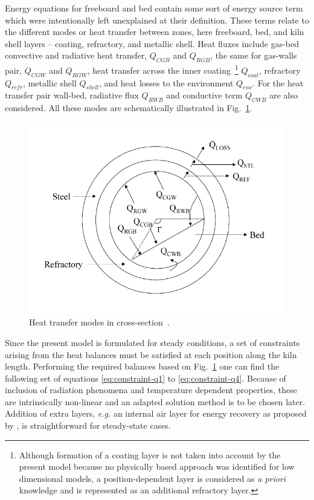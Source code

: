 \documentclass[11pt]{paper}
\begin{document}
Energy equations for freeboard and bed contain some sort of energy source term which were intentionally left unexplained at their definition. These terms relate to the different modes or heat transfer between zones, here freeboard, bed, and kiln shell layers -- coating, refractory, and metallic shell. Heat fluxes include gas-bed convective and radiative heat transfer, $Q_{CGB}$ and $Q_{RGB}$, the same for gas-walls pair, $Q_{CGW}$ and $Q_{RGW}$, heat transfer across the inner coating~\footnote{Although formation of a coating layer is not taken into account by the present model because no physically based approach was identified for low dimensional models, a position-dependent layer is considered as \emph{a priori} knowledge and is represented as an additional refractory layer.} $Q_{coat}$, refractory $Q_{refr}$, metallic shell $Q_{shell}$, and heat losses to the environment $Q_{env}$. For the heat transfer pair wall-bed, radiative flux $Q_{RWB}$ and conductive term $Q_{CWB}$ are also considered. All these modes are schematically illustrated in Fig.~\ref{fig:heat-transfer-modes}.

\begin{figure}[!ht]
\centering
\includegraphics[width=0.5\linewidth]{media/heat-transfer-mujumdar-2006}
\caption{\label{fig:heat-transfer-modes}Heat transfer modes in cross-section~\cite{Mujumdar2006i}.}
\end{figure}

Since the present model is formulated for steady conditions, a set of constraints arising from the heat balances must be satisfied at each position along the kiln length. Performing the required balances based on Fig.~\ref{fig:heat-transfer-modes} one can find the following set of equations \eqref{eq:constraint-q1} to \eqref{eq:constraint-q4}. Because of inclusion of radiation phenomena and temperature dependent properties, these are intrinsically non-linear and an adapted solution method is to be chosen later. Addition of extra layers, \emph{e.g.} an internal air layer for energy recovery as proposed by \textcite{Mujumdar2006ii}, is straightforward for steady-state cases.
\end{document}
